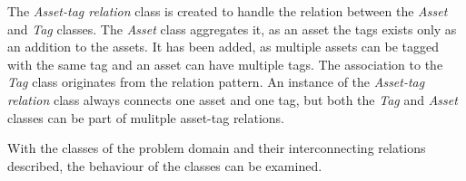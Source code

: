 The \textit{Asset-tag relation} class is created to handle the relation between the \textit{Asset} and \textit{Tag} classes. The \textit{Asset} class aggregates it, as an asset the tags exists only as an addition to the assets. It has been added, as multiple assets can be tagged with the same tag and an asset can have multiple tags. The association to the \textit{Tag} class originates from the relation pattern. An instance of the \textit{Asset-tag relation} class always connects one asset and one tag, but both the \textit{Tag} and \textit{Asset} classes can be part of mulitple asset-tag relations.
\par

With the classes of the problem domain and their interconnecting relations described, the behaviour of the classes can be examined.